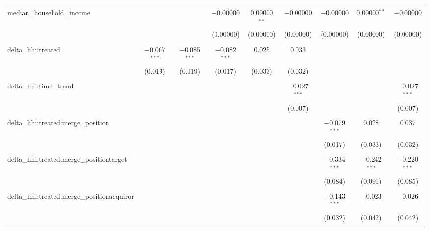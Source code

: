 \begin{table}[H]
{\begin{tabular}{@{\extracolsep{5pt}}lcccccccc}
   & & & & & & & & \\  

  median\_household\_income &  &  & $-$0.00000 & 0.00000$^{**}$ & $-$0.00000 & $-$0.00000 & 0.00000$^{**}$ & $-$0.00000 \\  

   &  &  & (0.00000) & (0.00000) & (0.00000) & (0.00000) & (0.00000) & (0.00000) \\  

   & & & & & & & & \\  

  delta\_hhi:treated & $-$0.067$^{***}$ & $-$0.085$^{***}$ & $-$0.082$^{***}$ & 0.025 & 0.033 &  &  &  \\  

   & (0.019) & (0.019) & (0.017) & (0.033) & (0.032) &  &  &  \\  

   & & & & & & & & \\  

  delta\_hhi:time\_trend &  &  &  &  & $-$0.027$^{***}$ &  &  & $-$0.027$^{***}$ \\  

   &  &  &  &  & (0.007) &  &  & (0.007) \\  

   & & & & & & & & \\  

  delta\_hhi:treated:merge\_position &  &  &  &  &  & $-$0.079$^{***}$ & 0.028 & 0.037 \\  

   &  &  &  &  &  & (0.017) & (0.033) & (0.032) \\  

   & & & & & & & & \\  

  delta\_hhi:treated:merge\_positiontarget &  &  &  &  &  & $-$0.334$^{***}$ & $-$0.242$^{***}$ & $-$0.220$^{***}$ \\  

   &  &  &  &  &  & (0.084) & (0.091) & (0.085) \\  

   & & & & & & & & \\  

  delta\_hhi:treated:merge\_positionacquiror &  &  &  &  &  & $-$0.143$^{***}$ & $-$0.023 & $-$0.026 \\  

   &  &  &  &  &  & (0.032) & (0.042) & (0.042) \\  

   & & & & & & & & \\  


\end{tabular}}
\end{table}
